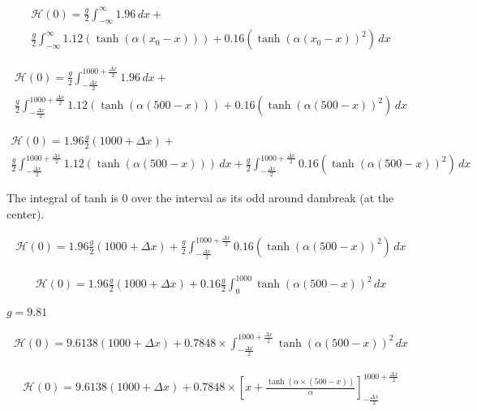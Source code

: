 \documentclass[12pt]{article}
\begin{document}
\begin{multline}
\mathcal{H} (0) = \frac{g}{2}\int_{-\infty}^{\infty}  1.96 \, dx + \\
\frac{g}{2}\int_{-\infty}^{\infty}  1.12\left(\tanh\left(\alpha\left(x_0 - x\right)\right)\right)   + 0.16\left(\tanh\left(\alpha\left(x_0 - x\right)\right)^2\right) \, dx 
\end{multline}

\begin{multline}
\mathcal{H} (0) = \frac{g}{2}\int_{-\frac{\Delta x}{2}}^{1000 + \frac{\Delta x}{2}}  1.96 \, dx + \\
\frac{g}{2}\int_{-\frac{\Delta x}{2}}^{1000 + \frac{\Delta x}{2}} 1.12\left(\tanh\left(\alpha\left(500 - x\right)\right)\right)   + 0.16\left(\tanh\left(\alpha\left(500 - x\right)\right)^2\right) \, dx 
\end{multline}

\begin{multline}
\mathcal{H} (0) = 1.96\frac{g}{2}(1000 + \Delta x) + \\
\frac{g}{2}\int_{-\frac{\Delta x}{2}}^{1000 + \frac{\Delta x}{2}} 1.12\left(\tanh\left(\alpha\left(500 - x\right)\right)\right) \, dx  + \frac{g}{2}\int_{-\frac{\Delta x}{2}}^{1000 + \frac{\Delta x}{2}} 0.16\left(\tanh\left(\alpha\left(500 - x\right)\right)^2\right) \, dx 
\end{multline}

The integral of tanh is 0 over the interval as its odd around dambreak (at the center).

\begin{multline}
\mathcal{H} (0) = 1.96\frac{g}{2}(1000 + \Delta x)+  \frac{g}{2}\int_{-\frac{\Delta x}{2}}^{1000 + \frac{\Delta x}{2}} 0.16\left(\tanh\left(\alpha\left(500 - x\right)\right)^2\right) \, dx 
\end{multline}

\begin{multline}
\mathcal{H} (0) = 1.96\frac{g}{2}(1000 + \Delta x)+  0.16\frac{g}{2}\int_{0}^{1000} \tanh\left(\alpha\left(500 - x\right)\right)^2 \, dx 
\end{multline}

$g = 9.81$

\begin{multline}
\mathcal{H} (0) = 9.6138(1000 + \Delta x) +  0.7848\times\int_{-\frac{\Delta x}{2}}^{1000 + \frac{\Delta x}{2}} \tanh\left(\alpha\left(500 - x\right)\right)^2 \, dx 
\end{multline}

\begin{multline}
\mathcal{H} (0) = 9.6138(1000 + \Delta x) +  0.7848\times \left[x + \frac{\tanh\left(\alpha \times(500 -x)\right)}{\alpha}\right]_{-\frac{\Delta x}{2}}^{1000 + \frac{\Delta x}{2}}
\end{multline}
\end{document}
